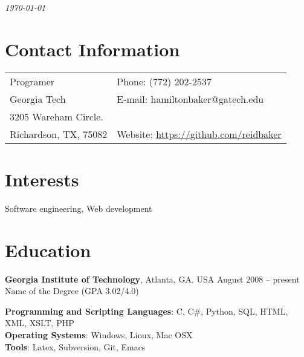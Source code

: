 \documentclass[margin,line]{res}
\begin{document}
 \hfill {\em \today}

\begin{resume}
\section{\sc Contact Information}

\vspace{.05in}
\begin{tabular}{@{}p{3.5in}p{3in}}
Programer             & {Phone:}  (772) 202-2537 \\
Georgia Tech
 & {E-mail:}  hamiltonbaker@gatech.edu\\
3205 Wareham Circle. \\
Richardson, TX, 75082  & {Website:} \url{https://github.com/reidbaker}
\end{tabular}


\section{\sc Interests}

Software engineering, Web development

\section{\sc Education}
{\bf Georgia Institute of Technology}, Atlanta, GA. USA \hfill August 2008 -- present\\

Name of the Degree \hfill(GPA 3.02/4.0)

{\bf Programming and Scripting Languages}:  C, C\#, Python, SQL, HTML, XML, XSLT, PHP\\
{\bf Operating Systems}: Windows, Linux, Mac OSX\\
{\bf Tools}: Latex, Subversion, Git, Emacs \\

\end{resume}
\end{document}
